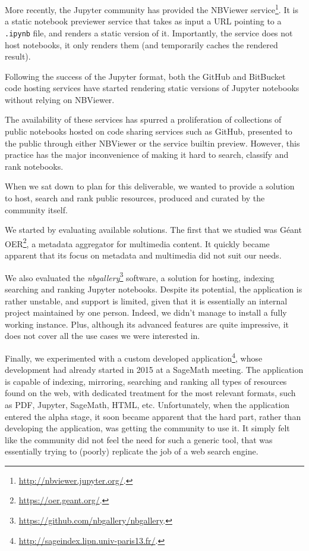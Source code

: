 More recently, the Jupyter community has provided the NBViewer
service\footnote{\url{http://nbviewer.jupyter.org/}.}. It is a static
notebook previewer service that takes as input a URL pointing to a
\texttt{.ipynb} file, and renders a static version of it. Importantly,
the service does not host notebooks, it only renders them (and
temporarily caches the rendered result).

Following the success of the Jupyter format, both the GitHub and
BitBucket code hosting services have started rendering static versions
of Jupyter notebooks without relying on NBViewer.

The availability of these services has spurred a proliferation of
collections of public notebooks hosted on code sharing services such as
GitHub, presented to the public through either NBViewer or the service
builtin preview. However, this practice has the major inconvenience of
making it hard to search, classify and rank notebooks.

When we sat down to plan for this deliverable, we wanted to provide a
solution to host, search and rank public resources, produced and curated
by the community itself.

We started by evaluating available solutions. The first that we studied
was Géant OER\footnote{\url{https://oer.geant.org/}.}, a metadata
aggregator for multimedia content. It quickly became apparent that its
focus on metadata and multimedia did not suit our needs.

We also evaluated the \emph{nbgallery}\footnote{\url{https://github.com/nbgallery/nbgallery}.}
software, a solution for hosting, indexing searching and ranking Jupyter
notebooks. Despite its potential, the application is rather unstable,
and support is limited, given that it is essentially an internal project
maintained by one person. Indeed, we didn't manage to install a fully
working instance. Plus, although its advanced features are quite
impressive, it does not cover all the use cases we were interested in.

Finally, we experimented with a custom developed application\footnote{\url{http://sageindex.lipn.univ-paris13.fr/}.},
whose development had already started in 2015 at a SageMath meeting. The
application is capable of indexing, mirroring, searching and ranking all
types of resources found on the web, with dedicated treatment for the
most relevant formats, such as PDF, Jupyter, SageMath, HTML, etc.
Unfortunately, when the application entered the alpha stage, it soon
became apparent that the hard part, rather than developing the
application, was getting the community to use it. It simply felt like
the community did not feel the need for such a generic tool, that was
essentially trying to (poorly) replicate the job of a web search engine.

